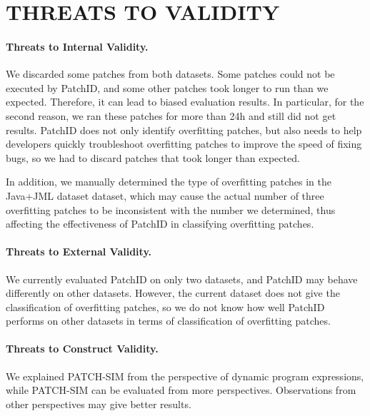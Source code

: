 \section{THREATS TO VALIDITY} \label{6}
\paragraph{Threats to Internal Validity.} We discarded some patches from both datasets. Some patches could not be executed by PatchID, and some other patches took longer to run than we expected. Therefore, it can lead to biased evaluation results. In particular, for the second reason, we ran these patches for more than 24h and still did not get results. PatchID does not only identify overfitting patches, but also needs to help developers quickly troubleshoot overfitting patches to improve the speed of fixing bugs, so we had to discard patches that took longer than expected.

In addition, we manually determined the type of overfitting patches in the Java+JML dataset dataset, which may cause the actual number of three overfitting patches to be inconsistent with the number we determined, thus affecting the effectiveness of PatchID in classifying overfitting patches.

\paragraph{Threats to External Validity.} We currently evaluated PatchID on only two datasets, and PatchID may behave differently on other datasets. However, the current dataset does not give the classification of overfitting patches, so we do not know how well PatchID performs on other datasets in terms of classification of overfitting patches.

\paragraph{Threats to Construct Validity.} We explained PATCH-SIM from the perspective of dynamic program expressions, while PATCH-SIM can be evaluated from more perspectives. Observations from other perspectives may give better results.

